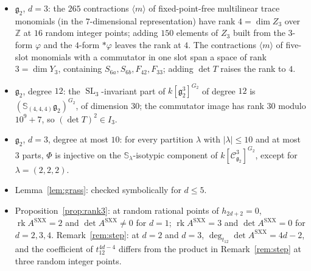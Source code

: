 \documentclass[11pt]{article}
\theoremstyle{definition}
\newcommand{\g}{\mathfrak g}
\newcommand{\Cs}{\mathcal C}
\newcommand{\rk}{\operatorname{rk}}
\newcommand{\Sf}{\mathbb S}
\newcommand{\Asxx}{A^{\mathrm{SXX}}}
\DeclareMathOperator{\SL}{SL}
\begin{document}
\begin{itemize}[leftmargin=*]
\item $\g_2$, $d=3$: the $265$ contractions $\langle m\rangle$ of fixed-point-free multilinear trace monomials (in the $7$-dimensional representation) have rank $4=\dim Z_3$ over $\mathbb Z$ at $16$ random integer points; adding $150$ elements of $Z_3$ built from the $3$-form $\varphi$ and the $4$-form ${*}\varphi$ leaves the rank at $4$. The contractions $\langle m\rangle$ of five-slot monomials with a commutator in one slot span a space of rank $3=\dim Y_3$, containing $S_{6a},S_{6b},F_{42},F_{33}$; adding $\det T$ raises the rank to $4$.
\item $\g_2$, degree $12$: the $\SL_3$-invariant part of $k[\g_2^3]^{G_2}$ of degree $12$ is $(\Sf_{(4,4,4)}\g_2)^{G_2}$, of dimension $30$; the commutator image has rank $30$ modulo $10^9+7$, so $(\det T)^2\in I_3$.
\item $\g_2$, $d=3$, degree at most $10$: for every partition $\lambda$ with $|\lambda|\le10$ and at most $3$ parts, $\Phi$ is injective on the $\Sf_\lambda$-isotypic component of $k[\Cs^3_{\g_2}]^{G_2}$, except for $\lambda=(2,2,2)$.
\item Lemma~\ref{lem:grass}: checked symbolically for $d\le5$.
\item Proposition~\ref{prop:rank3}: at random rational points of $h_{2d+2}=0$, $\rk\Asxx=2$ and $\det\Asxx\neq0$ for $d=1$; $\rk\Asxx=3$ and $\det\Asxx=0$ for $d=2,3,4$. Remark~\ref{rem:step}: at $d=2$ and $d=3$, $\deg_{t_{12}}\det\Asxx=4d-2$, and the coefficient of $t_{12}^{4d-4}$ differs from the product in Remark~\ref{rem:step} at three random integer points.
\end{itemize}
\end{document}
